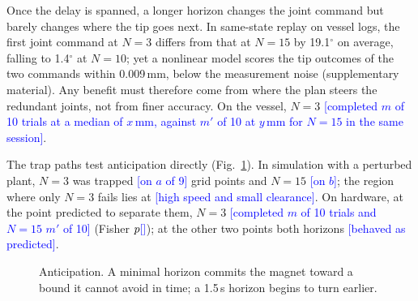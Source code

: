 \documentclass[journal]{IEEEtran}
\newcommand{\NEWRUN}[1]{\textcolor{blue}{[#1]}}
\newcommand{\figph}[3]{%
  \fbox{\parbox[c][#2][c]{\dimexpr#1-2\fboxsep-2\fboxrule\relax}{%
  \centering\footnotesize\textcolor{gray}{\textbf{Figure placeholder}}\\[2pt]
  \parbox{0.9\linewidth}{\centering\footnotesize\textcolor{gray}{#3}}}}}
\begin{document}
Once the delay is spanned, a longer horizon changes the joint command
but barely changes where the tip goes next. In same-state replay on vessel
logs, the first joint command at $N=3$ differs from that at $N=15$ by
19.1$^\circ$ on average, falling to 1.4$^\circ$ at $N=10$; yet a nonlinear
model scores the tip outcomes of the two commands within 0.009\,mm,
below the measurement noise (supplementary material). Any benefit must
therefore come from where the plan steers the redundant joints, not from
finer accuracy. On the vessel, $N=3$ \NEWRUN{completed $m$ of 10 trials
at a median of $x$\,mm, against $m'$ of 10 at $y$\,mm for $N=15$ in the
same session}.

The trap paths test anticipation directly (Fig.~\ref{fig:trap}). In
simulation with a perturbed plant, $N=3$ was trapped \NEWRUN{on $a$ of
9} grid points and $N=15$ \NEWRUN{on $b$}; the region where only $N=3$ fails
lies at \NEWRUN{high speed and small clearance}. On hardware, at the point
predicted to separate them, $N=3$ \NEWRUN{completed $m$ of 10 trials and
$N=15$ $m'$ of 10} (Fisher $p\NEWRUN{}$); at the other two points both
horizons \NEWRUN{behaved as predicted}.

\begin{figure}[t]
\centering
\figph{\columnwidth}{4.6cm}{(a) Simulated outcome over reference speed
fraction $\alpha$ and planned clearance $\delta$ for $N=3$ (left) and
$N=15$ (right): completed, trapped, or aborted; hardware test points
circled. (b) One hardware trial at the separating point: height-band
clearance and QP status versus time for $N=3$ and $N=15$.}
\caption{Anticipation. A minimal horizon commits the magnet toward a bound
it cannot avoid in time; a 1.5\,s horizon begins to turn earlier.}
\label{fig:trap}
\end{figure}
\end{document}
